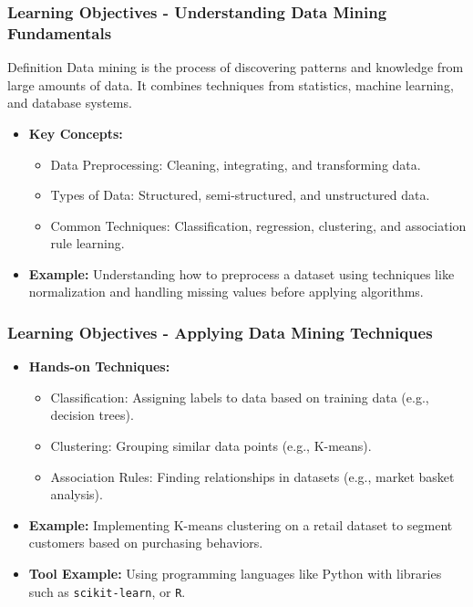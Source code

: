 \documentclass[aspectratio=169]{beamer}
\begin{document}
\begin{frame}[fragile]
    \frametitle{Learning Objectives - Understanding Data Mining Fundamentals}
    \begin{block}{Definition}
        Data mining is the process of discovering patterns and knowledge from large amounts of data. It combines techniques from statistics, machine learning, and database systems.
    \end{block}
    \begin{itemize}
        \item \textbf{Key Concepts:}
            \begin{itemize}
                \item Data Preprocessing: Cleaning, integrating, and transforming data.
                \item Types of Data: Structured, semi-structured, and unstructured data.
                \item Common Techniques: Classification, regression, clustering, and association rule learning.
            \end{itemize}
        \item \textbf{Example:} 
            Understanding how to preprocess a dataset using techniques like normalization and handling missing values before applying algorithms.
    \end{itemize}
\end{frame}

\begin{frame}[fragile]
    \frametitle{Learning Objectives - Applying Data Mining Techniques}
    \begin{itemize}
        \item \textbf{Hands-on Techniques:}
            \begin{itemize}
                \item Classification: Assigning labels to data based on training data (e.g., decision trees).
                \item Clustering: Grouping similar data points (e.g., K-means).
                \item Association Rules: Finding relationships in datasets (e.g., market basket analysis).
            \end{itemize}
        \item \textbf{Example:} 
            Implementing K-means clustering on a retail dataset to segment customers based on purchasing behaviors.
        \item \textbf{Tool Example:} 
            Using programming languages like Python with libraries such as \texttt{scikit-learn}, or \texttt{R}.
    \end{itemize}
\end{frame}
\end{document}
